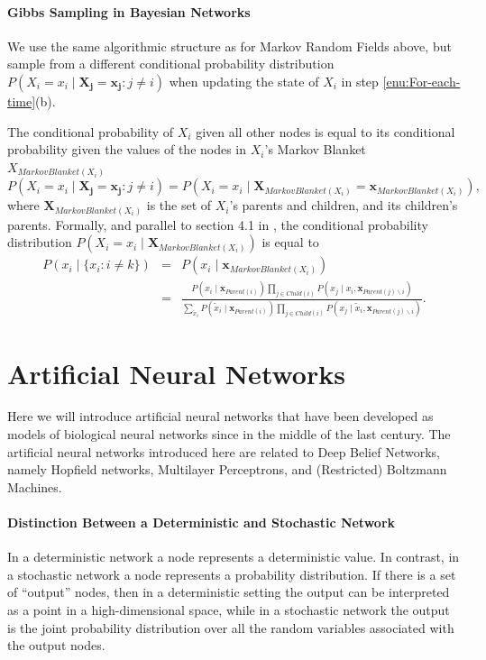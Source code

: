 \paragraph{Gibbs Sampling in Bayesian Networks}

We use the same algorithmic structure as for Markov Random Fields
above, but sample from a different conditional probability distribution
$P(X_{i}=x_{i}\mid\mathbf{X_{j}}=\mathbf{x_{j}}:j\neq i)$ when updating
the state of $X_{i}$ in step \ref{enu:For-each-time}(b).

The conditional probability of $X_{i}$ given all other nodes is equal
to its conditional probability given the values of the nodes in $X_{i}$'s
Markov Blanket $X_{MarkovBlanket(X_{i})}$
\[
P(X_{i}=x_{i}\mid\mathbf{X_{j}}=\mathbf{x_{j}}:j\neq i)=P(X_{i}=x_{i}\mid\mathbf{X}_{MarkovBlanket(X_{i})}=\mathbf{x}_{MarkovBlanket(X_{i})}),
\]
where $\mathbf{X}_{MarkovBlanket(X_{i})}$ is the set of $X_{i}$'s
parents and children, and its children's parents. Formally, and parallel
to section 4.1 in \cite{Neal1993}, the conditional probability distribution
$P(X_{i}=x_{i}\mid\mathbf{X}_{MarkovBlanket(X_{i})})$ is equal to
\begin{eqnarray*}
P(x_{i}\mid\{x_{i}:i\neq k\}) & = & P(x_{i}\mid\mathbf{x}_{MarkovBlanket(X_{i})})\\
 & = & \frac{P(x_{i}\mid\mathbf{x}_{Parent(i)})\prod_{j\in Child(i)}P(x_{j}\mid x_{i},\mathbf{x}_{Parent(j)\backslash i})}{\sum_{\tilde{x}_{i}}P(\tilde{x}_{i}\mid\mathbf{x}_{Parent(i)})\prod_{j\in Child(i)}P(x_{j}\mid\tilde{x}_{i},\mathbf{x}_{Parent(j)\backslash i})}.
\end{eqnarray*}

\section{Artificial Neural Networks}

Here we will introduce artificial neural networks that have been developed
as models of biological neural networks since in the middle of the
last century. The artificial neural networks introduced here are related
to Deep Belief Networks, namely Hopfield networks, Multilayer Perceptrons,
and (Restricted) Boltzmann Machines.

\paragraph{Distinction Between a Deterministic and Stochastic Network}

In a deterministic network a node represents
a deterministic value. In contrast, in a stochastic network
a node represents a probability distribution. If there is a set of
``output'' nodes, then in a deterministic setting the output can
be interpreted as a point in a high-dimensional space, while in a
stochastic network the output is the joint probability distribution
over all the random variables associated with the output nodes.

